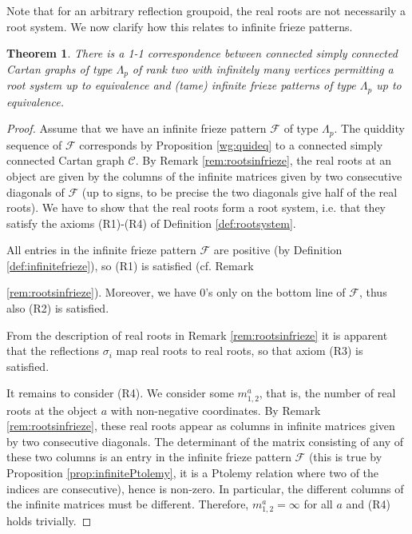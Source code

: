 \documentclass[11pt,a4paper]{amsart}
\newtheorem{Theorem}[Lemma]{Theorem}
\theoremstyle{definition}
\numberwithin{equation}{section}
\newcommand{\Cc }{\mathcal{C}}
\begin{document}
Note that for an arbitrary reflection groupoid, the real roots are not necessarily a root system.
We now clarify how this relates to infinite frieze patterns.



\begin{Theorem} \label{thm:cartanfriezep}
There is a 1-1 correspondence between connected simply connected Cartan graphs of type $\Lambda_p$ of rank two with infinitely many 
vertices permitting a root system
up to equivalence and (tame) infinite frieze patterns of type $\Lambda_p$ up to equivalence.
\end{Theorem}

\begin{proof}
Assume that we have an infinite frieze pattern 
$\mathcal{F}$ of type $\Lambda_p$.
The quiddity sequence of $\mathcal{F}$
corresponds by 
Proposition \ref{wg:quideq}
to a connected simply connected Cartan graph $\Cc$.
By Remark \ref{rem:rootsinfrieze}, the real 
roots at an object are given by the columns of 
the infinite matrices given by two 
consecutive diagonals of $\mathcal{F}$
(up to signs, to be precise
the two diagonals give half
of the real roots). We have to show that 
the real roots form a root system, i.e. 
that they satisfy the axioms (R1)-(R4)
of Definition \ref{def:rootsystem}.
\smallskip

All entries in the infinite frieze pattern
$\mathcal{F}$ are positive (by 
Definition \ref{def:infinitefrieze}), so (R1) is satisfied (cf. Remark {\ref{rem:rootsinfrieze}).
Moreover, we have $0$'s only on the bottom line
of $\mathcal{F}$, thus also (R2) is satisfied.

From the description of real roots in
Remark \ref{rem:rootsinfrieze} it is 
apparent that the reflections $\sigma_i$ 
map real roots to real roots, so that
axiom (R3) is satisfied. 

It remains to consider (R4). We consider
some $m_{1,2}^a$, that is, the number of 
real roots at the object $a$ with 
non-negative coordinates. 
By Remark \ref{rem:rootsinfrieze}, 
these real roots appear as columns in 
infinite matrices given by two consecutive 
diagonals. The 
determinant of the matrix consisting of 
any of these two columns is an entry in the
infinite frieze pattern $\mathcal{F}$
(this is true by Proposition 
\ref{prop:infinitePtolemy}, it is a Ptolemy relation
where two of the indices are consecutive),
hence is non-zero. In particular, 
the different columns of the infinite 
matrices must be different. Therefore,
$m_{1,2}^a=\infty$ for
all $a$ and (R4) holds 
trivially. 
\smallskip

}
\end{proof}
\end{document}
